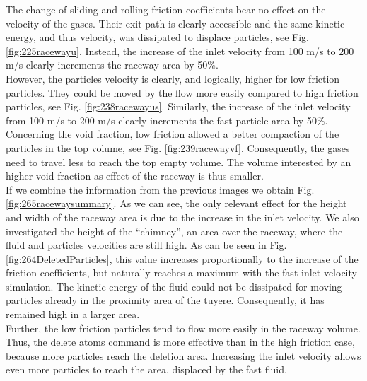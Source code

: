 The change of sliding and rolling friction coefficients bear no effect on the
velocity of the gases. 
Their exit path is clearly accessible and the same kinetic energy, and thus velocity, was
dissipated to displace particles, see Fig. \ref{fig:225racewayu}.
Instead, the increase of the inlet velocity from 100 m/s to 200 m/s clearly
increments the raceway area by 50\%.\\
However, the particles velocity is clearly, and logically, higher for low
friction particles. They could be moved by the flow more easily compared to high
friction particles, see Fig. \ref{fig:238racewayus}.
Similarly, the increase of the inlet velocity from 100 m/s to 200 m/s clearly
increments the fast particle area by 50\%.\\
Concerning the void fraction, low friction allowed a better compaction of the
particles in the top volume, see Fig. \ref{fig:239racewayvf}.
Consequently, the gases need to travel less to reach the top empty volume.
The volume interested by an higher void fraction as effect of the raceway is
thus smaller.\\
If we combine the information from the previous images we obtain Fig.
\ref{fig:265racewaysummary}.
As we can see, the only relevant effect for the height and width of the raceway
area is due to the increase in the inlet velocity. 
We also investigated the height of the ``chimney'', an area over the
raceway, where the fluid and particles velocities are still high.
As can be seen in Fig. \ref{fig:264DeletedParticles}, this value increases
proportionally to the increase of the friction coefficients, but naturally
reaches a maximum with the fast inlet velocity simulation.
The kinetic energy of the fluid could not be dissipated for moving particles
already in the proximity area of the tuyere.
Consequently, it has remained high in a larger area.\\
Further, the low friction particles tend to flow more easily in the raceway volume. 
Thus, the delete atoms command is more effective than in the high friction case,
because more particles reach the deletion area.
Increasing the inlet velocity allows even more particles to reach the area,
displaced by the fast fluid.









% 
% 
% 
% 
% 
% 
% 


